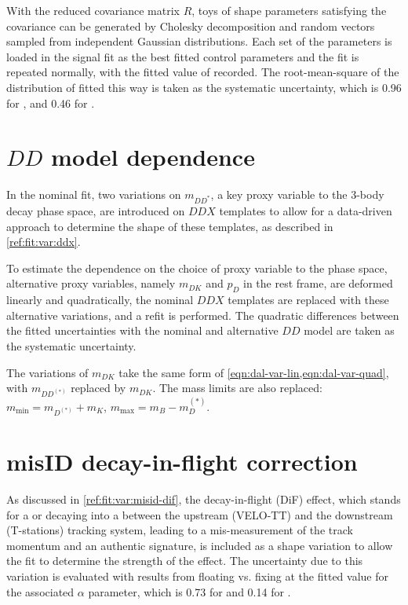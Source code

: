With the reduced covariance matrix $R$, toys of shape parameters satisfying
the covariance can be generated by Cholesky decomposition and random vectors
sampled from independent Gaussian distributions.
Each set of the parameters is loaded in the signal fit as the best
fitted control parameters and the fit is repeated normally,
with the fitted value of \RDX recorded.
The root-mean-square of the distribution of \RDX fitted this way is taken as
the systematic uncertainty,
which is 0.96 for \RD, and 0.46 for \RDst.



\section{$DD$ model dependence}
\label{sys-model-ddx}

In the nominal fit, two variations on $m_{DD^{*}}$,
a key proxy variable to the 3-body decay phase space,
are introduced on $DDX$ templates to allow for a data-driven approach to
determine the shape of these templates, as described in
\cref{ref:fit:var:ddx}.

To estimate the dependence on the choice of proxy variable to the phase space,
alternative proxy variables, namely $m_{DK}$ and $p_D$ in the \B rest frame,
are deformed linearly and quadratically,
the nominal $DDX$ templates are replaced with these alternative variations,
and a refit is performed.
The quadratic differences between the fitted uncertainties with the nominal and
alternative $DD$ model are taken as the systematic uncertainty.

The variations of $m_{DK}$ take the same form of
\cref{eqn:dal-var-lin,eqn:dal-var-quad}, with $m_{DD^{(*)}}$ replaced by
$m_{DK}$.
The mass limits are also replaced:
$m_\text{min} = m_{D^{(*)}} + m_K$, $m_\text{max} = m_B - m_D^{(*)}$.


\section{\muon misID decay-in-flight correction}
\label{sys-model-dif}

As discussed in \cref{ref:fit:var:misid-dif},
the decay-in-flight (DiF) effect,
which stands for a \kaon or \pion decaying into a \muon between the upstream
(VELO-TT) and the downstream (T-stations) tracking system,
leading to a mis-measurement of the track momentum and an authentic \muon
signature,
is included as a shape variation to allow the fit to determine
the strength of the effect.
The uncertainty due to this variation is evaluated with results
from floating vs. fixing at the fitted value for the associated $\alpha$
parameter,
which is 0.73 for \RD and 0.14 for \RDst.


